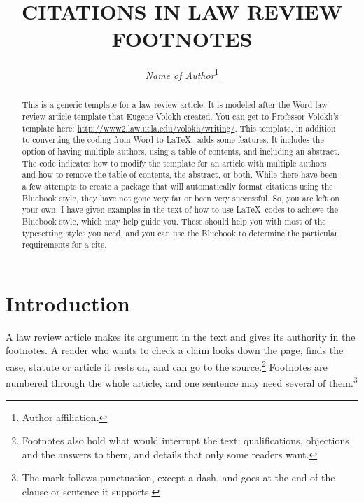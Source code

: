 \documentclass[letterpaper,12pt,twoside]{article}
\title{\Large{\uppercase{Citations in Law Review Footnotes}}}
\author{\large\emph{Name of Author}\thanks{Author affiliation.}}
\date{} %
\begin{document}

\maketitle
\thispagestyle{empty}

	\begin{abstract}
	This is a generic template for a law review article. It is modeled after the Word law review article template that Eugene Volokh created. You can get to Professor Volokh's template here: \url{http://www2.law.ucla.edu/volokh/writing/}. This template, in addition to converting the coding from Word to \LaTeX,~adds some features. It includes the option of having multiple authors, using a table of contents, and including an abstract. The code indicates how to modify the template for an article with multiple authors and how to remove the table of contents, the abstract, or both. While there have been a few attempts to create a package that will automatically format citations using the Bluebook style, they have not gone very far or been very successful. So, you are left on your own. I have given examples in the text of how to use \LaTeX~codes to achieve the Bluebook style, which may help guide you. These should help you with most of the typesetting styles you need, and you can use the Bluebook to determine the particular requirements for a cite. 
	\end{abstract}

\tableofcontents %
\vspace{14pt}
\clearpage

\section*{Introduction}

A law review article makes its argument in the text and gives its authority in the footnotes. A reader who wants to check a claim looks down the page, finds the case, statute or article it rests on, and can go to the source.\footnote{Footnotes also hold what would interrupt the text: qualifications, objections and the answers to them, and details that only some readers want.} Footnotes are numbered through the whole article, and one sentence may need several of them.\footnote{The mark follows punctuation, except a dash, and goes at the end of the clause or sentence it supports.}
\end{document}
